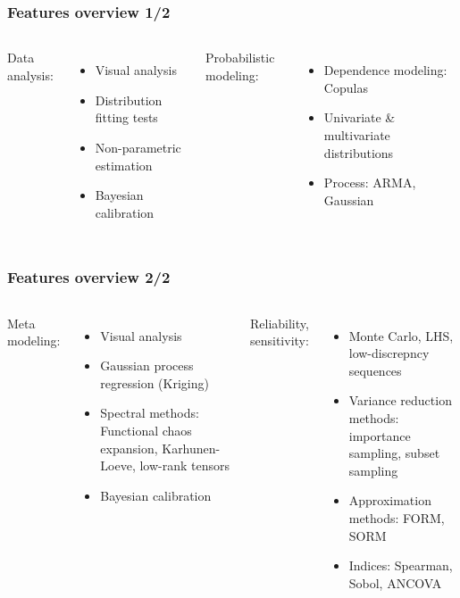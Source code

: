 \documentclass{beamer}
\begin{document}
\begin{frame}[containsverbatim]
\frametitle{Features overview 1/2}

  \begin{columns}
Data analysis:
\begin{itemize}
\item Visual analysis
\item Distribution fitting tests
\item Non-parametric estimation
\item Bayesian calibration
\end{itemize}


Probabilistic modeling:
\begin{itemize}
\item Dependence modeling: Copulas
\item Univariate \& multivariate distributions
\item Process: ARMA, Gaussian
\end{itemize}

\end{columns}

\end{frame}



\begin{frame}[containsverbatim]
\frametitle{Features overview 2/2}

  \begin{columns}
Meta modeling:
\begin{itemize}
\item Visual analysis
\item Gaussian process regression (Kriging)
\item Spectral methods: Functional chaos expansion, Karhunen-Loeve, low-rank tensors
\item Bayesian calibration
\end{itemize}


Reliability, sensitivity:
\begin{itemize}
\item Monte Carlo, LHS, low-discrepncy sequences
\item Variance reduction methods: importance sampling, subset sampling
\item Approximation methods: FORM, SORM
\item Indices: Spearman, Sobol, ANCOVA
\end{itemize}

\end{columns}

\end{frame}
\end{document}
